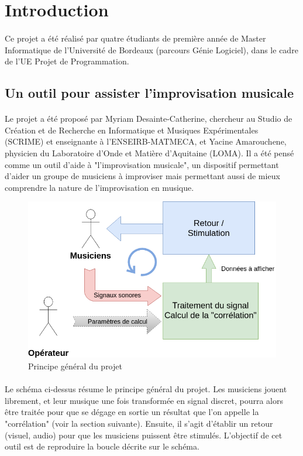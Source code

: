 
\section{Introduction}
\paragraph{}
Ce projet a été réalisé par quatre étudiants de première année de
Master Informatique de l'Université de Bordeaux (parcours Génie
Logiciel), dans le cadre de l'UE Projet de Programmation.

\subsection{Un outil pour assister l'improvisation musicale}
\paragraph{}
Le projet a été proposé par Myriam Desainte-Catherine, chercheur au
Studio de Création et de Recherche en Informatique et Musiques
Expérimentales (SCRIME) et enseignante à l'ENSEIRB-MATMECA, et Yacine
Amarouchene, physicien du Laboratoire d'Onde et Matière d'Aquitaine
(LOMA). Il a été pensé comme un outil d'aide à "l'improvisation
musicale", un dispositif permettant d'aider un groupe de musiciens à
improviser mais permettant aussi de mieux comprendre la nature de
l'improvisation en musique.

\begin{figure}[H]
      \centering
      \includegraphics[scale=0.5]{assets/principe_global.png}
      \caption{Principe général du projet}
      \label{principe général}
\end{figure}
\paragraph{}
Le schéma ci-dessus résume le principe général du projet. Les
musiciens jouent librement, et leur musique une fois transformée en
signal discret, pourra alors être traitée pour que se dégage en sortie
un résultat que l'on appelle la "corrélation" (voir la section
suivante). Ensuite, il s'agit d'établir un retour (visuel, audio) pour
que les musiciens puissent être stimulés. L'objectif de cet outil est
de reproduire la boucle décrite sur le schéma.

